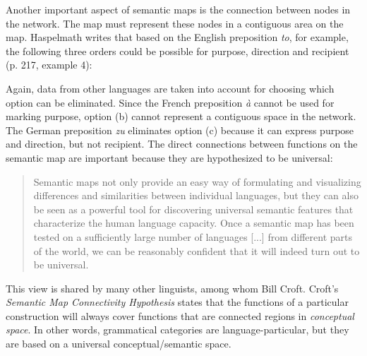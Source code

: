 Another important aspect of semantic maps is the connection between nodes in the network. The map must represent these nodes in a contiguous area on the map. Haspelmath writes that based on the English preposition {\em to}, for example, the following three orders could be possible for purpose, direction and recipient (p. 217, example 4):

\eal
{}
\zl

Again, data from other languages are taken into account for choosing which option can be eliminated. Since the French preposition {\em \`{a}} cannot be used for marking purpose, option (b) cannot represent a contiguous space in the network. The German preposition {\em zu} eliminates option (c) because it can express purpose and direction, but not recipient. The direct connections between functions on the semantic map are important because they are hypothesized to be universal:

\begin{quote}
Semantic maps not only provide an easy way of formulating and visualizing differences and similarities between individual languages, but they can also be seen as a powerful tool for discovering universal semantic features that characterize the human language capacity. Once a semantic map has been tested on a sufficiently large number of languages [...] from different parts of the world, we can be reasonably confident that it will indeed turn out to be universal. \citep[p. 232]{haspelmath03geometry} 
\end{quote}

This view is shared by many other linguists, among whom Bill Croft. Croft's {\em Semantic Map Connectivity Hypothesis} \citep[p. 96]{croft01radical} states that the functions of a particular construction will always cover functions that are connected regions in {\em conceptual space}. In other words, grammatical categories are language-particular, but they are based on a universal conceptual/semantic space.

